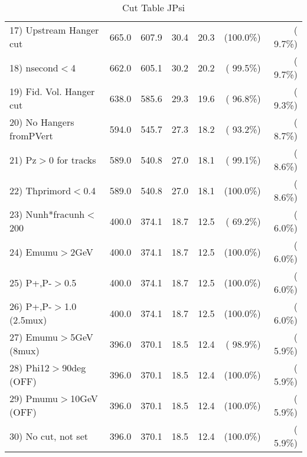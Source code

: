 \begin{table}[h!]
\begin{tabular}{||l||r|r|r|r|r|r||}
 17) Upstream Hanger cut  &        665.0 &        607.9 &         30.4 &         20.3 & (100.0\%) & (  9.7\%) \\
 18) nsecond$<$4          &        662.0 &        605.1 &         30.2 &         20.2 & ( 99.5\%) & (  9.7\%) \\
 19) Fid. Vol. Hanger cut &        638.0 &        585.6 &         29.3 &         19.6 & ( 96.8\%) & (  9.3\%) \\
 20) No Hangers fromPVert &        594.0 &        545.7 &         27.3 &         18.2 & ( 93.2\%) & (  8.7\%) \\
 21) Pz$>$0 for tracks    &        589.0 &        540.8 &         27.0 &         18.1 & ( 99.1\%) & (  8.6\%) \\
 22) Thprimord$<$0.4      &        589.0 &        540.8 &         27.0 &         18.1 & (100.0\%) & (  8.6\%) \\
 23) Nunh*fracunh$<$200   &        400.0 &        374.1 &         18.7 &         12.5 & ( 69.2\%) & (  6.0\%) \\
 24) Emumu$>$2GeV         &        400.0 &        374.1 &         18.7 &         12.5 & (100.0\%) & (  6.0\%) \\
 25) P+,P-$>$0.5          &        400.0 &        374.1 &         18.7 &         12.5 & (100.0\%) & (  6.0\%) \\
 26) P+,P-$>$1.0 (2.5mux) &        400.0 &        374.1 &         18.7 &         12.5 & (100.0\%) & (  6.0\%) \\
 27) Emumu$>$5GeV  (8mux) &        396.0 &        370.1 &         18.5 &         12.4 & ( 98.9\%) & (  5.9\%) \\
 28) Phi12$>$90deg  (OFF) &        396.0 &        370.1 &         18.5 &         12.4 & (100.0\%) & (  5.9\%) \\
 29) Pmumu$>$10GeV  (OFF) &        396.0 &        370.1 &         18.5 &         12.4 & (100.0\%) & (  5.9\%) \\
 30) No cut, not set      &        396.0 &        370.1 &         18.5 &         12.4 & (100.0\%) & (  5.9\%) \\
 \hline
 \hline
 \end{tabular}
 \caption{Cut Table  JPsi     }
 \label{tab-cutcohjpsi-mumu_cohrhop}
 \end{table}
